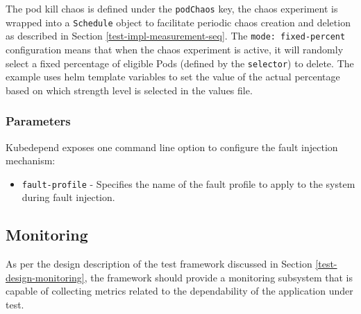 The pod kill chaos is defined under the \texttt{podChaos} key, the chaos experiment is wrapped into a \texttt{Schedule} object to facilitate periodic chaos creation and deletion as described in Section \ref{test-impl-measurement-seq}. The \texttt{mode: fixed-percent} configuration means that when the chaos experiment is active, it will randomly select a fixed percentage of eligible Pods (defined by the \texttt{selector}) to delete. The example uses helm template variables to set the value of the actual percentage based on which strength level is selected in the values file.

\subsubsection{Parameters}

Kubedepend exposes one command line option to configure the fault injection mechanism:

\begin{itemize}
	\item \texttt{fault-profile} - Specifies the name of the fault profile to apply to the system during fault injection.
\end{itemize}

\subsection{Monitoring} \label{test-impl-monitoring}

%	
%	

As per the design description of the test framework discussed in Section \ref{test-design-monitoring}, the framework should provide a monitoring subsystem that is capable of collecting metrics related to the dependability of the application under test.

